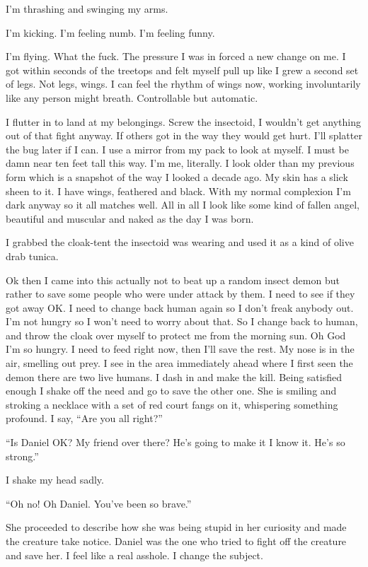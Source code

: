 I'm thrashing and swinging my arms.

I'm kicking. I'm feeling numb. I'm feeling funny.

I'm flying. What the fuck. The pressure I was in forced a new change on me. I got within seconds of the treetops and felt myself pull up like I grew a second set of legs. Not legs, wings. I can feel the rhythm of wings now, working involuntarily like any person might breath. Controllable but automatic.

I flutter in to land at my belongings. Screw the insectoid, I wouldn't get anything out of that fight anyway. If others got in the way they would get hurt. I'll splatter the bug later if I can. I use a mirror from my pack to look at myself. I must be damn near ten feet tall this way. I'm me, literally. I look older than my previous form which is a snapshot of the way I looked a decade ago. My skin has a slick sheen to it. I have wings, feathered and black. With my normal complexion I'm dark anyway so it all matches well. All in all I look like some kind of fallen angel, beautiful and muscular and naked as the day I was born.

I grabbed the cloak-tent the insectoid was wearing and used it as a kind of olive drab tunica.

Ok then I came into this actually not to beat up a random insect demon but rather to save some people who were under attack by them. I need to see if they got away OK.
I need to change back human again so I don't freak anybody out. I'm not hungry so I won't need to worry about that.
So I change back to human, and throw the cloak over myself to protect me from the morning sun. Oh God I'm so hungry.
I need to feed right now, then I'll save the rest.
My nose is in the air, smelling out prey. I see in the area immediately ahead where I first seen the demon there are two live humans.
I dash in and make the kill. Being satisfied enough I shake off the need and go to save the other one. She is smiling and stroking a necklace with a set of red court fangs on it, whispering something profound. I say, ``Are you all right?''

``Is Daniel OK? My friend over there? He's going to make it I know it. He's so strong.''

I shake my head sadly.

``Oh no! Oh Daniel. You've been so brave.''

She proceeded to describe how she was being stupid in her curiosity and made the creature take notice. Daniel was the one who tried to fight off the creature and save her. I feel like a real asshole. I change the subject.

